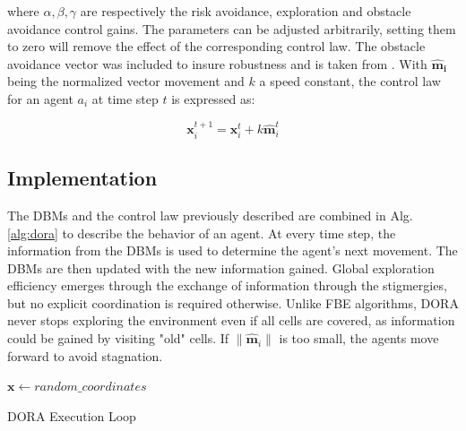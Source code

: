 \documentclass[letterpaper, 10 pt, conference]{ieeeconf}
\begin{document}
where $\alpha, \beta, \gamma$ are respectively the risk avoidance,
exploration and obstacle avoidance control gains. The parameters can
be adjusted arbitrarily, setting them to zero will remove the effect
of the corresponding control law. The obstacle avoidance vector was
included to insure robustness and is taken from
\cite{shahriari2018lightweight}. With $\bm{\hat{m}_i}$ being the
normalized vector movement and $k$ a speed constant, the control law
for an agent $a_i$ at time step $t$ is expressed as:

\begin{equation}
    \bm{x}_i^{t+1} = \bm{x}_i^t + k \bm{\hat{m}}_i^t
    \label{eq:control}
\end{equation}



\subsection{Implementation}
The DBMs and the control law previously described are combined in
Alg. \ref{alg:dora} to describe the behavior of an agent. At every
time step, the information from the DBMs is used to determine the
agent's next movement. The DBMs are then updated with the new
information gained. Global exploration efficiency emerges through the
exchange of information through the stigmergies, but no explicit
coordination is required otherwise. Unlike FBE algorithms, DORA never
stops exploring the environment even if all cells are covered, as
information could be gained by visiting "old" cells. If
$\|\bm{\hat{m}}_i\|$ is too small, the agents move forward to avoid
stagnation.

\begin{algorithm}[h]
\small
\SetAlgoLined
\DontPrintSemicolon
 $\bm{x} \leftarrow random\_coordinates$\;
 \caption{DORA Execution Loop}
 \label{alg:dora}
\end{algorithm}
\end{document}
